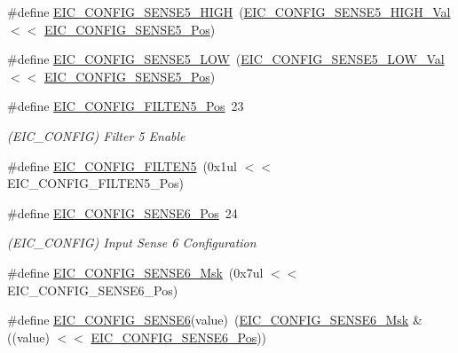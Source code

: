 \begin{DoxyCompactItemize}
\item 
\#define \mbox{\hyperlink{group___s_a_m_d21___e_i_c_ga2444c739cc4da9c4da66e9b43c8eb75d}{E\+I\+C\+\_\+\+C\+O\+N\+F\+I\+G\+\_\+\+S\+E\+N\+S\+E5\+\_\+\+H\+I\+GH}}~(\mbox{\hyperlink{group___s_a_m_d21___e_i_c_gafc521f838a152ea846c8ba29d2d7e578}{E\+I\+C\+\_\+\+C\+O\+N\+F\+I\+G\+\_\+\+S\+E\+N\+S\+E5\+\_\+\+H\+I\+G\+H\+\_\+\+Val}}    $<$$<$ \mbox{\hyperlink{group___s_a_m_d21___e_i_c_gace7caae074bf08e88805b591c626fb7f}{E\+I\+C\+\_\+\+C\+O\+N\+F\+I\+G\+\_\+\+S\+E\+N\+S\+E5\+\_\+\+Pos}})
\item 
\#define \mbox{\hyperlink{group___s_a_m_d21___e_i_c_gaf861de0eab75083882db5df50f0330c8}{E\+I\+C\+\_\+\+C\+O\+N\+F\+I\+G\+\_\+\+S\+E\+N\+S\+E5\+\_\+\+L\+OW}}~(\mbox{\hyperlink{group___s_a_m_d21___e_i_c_ga4a2958b65315240e85c9bf06c9c92305}{E\+I\+C\+\_\+\+C\+O\+N\+F\+I\+G\+\_\+\+S\+E\+N\+S\+E5\+\_\+\+L\+O\+W\+\_\+\+Val}}     $<$$<$ \mbox{\hyperlink{group___s_a_m_d21___e_i_c_gace7caae074bf08e88805b591c626fb7f}{E\+I\+C\+\_\+\+C\+O\+N\+F\+I\+G\+\_\+\+S\+E\+N\+S\+E5\+\_\+\+Pos}})
\item 
\#define \mbox{\hyperlink{group___s_a_m_d21___e_i_c_gab3c6837a90614cf79a4d0feece41fdd6}{E\+I\+C\+\_\+\+C\+O\+N\+F\+I\+G\+\_\+\+F\+I\+L\+T\+E\+N5\+\_\+\+Pos}}~23
\begin{DoxyCompactList}\small\item\em (E\+I\+C\+\_\+\+C\+O\+N\+F\+IG) Filter 5 Enable \end{DoxyCompactList}\item 
\#define \mbox{\hyperlink{group___s_a_m_d21___e_i_c_ga01928d66cdcdba5ec3176653d2b3ea2a}{E\+I\+C\+\_\+\+C\+O\+N\+F\+I\+G\+\_\+\+F\+I\+L\+T\+E\+N5}}~(0x1ul $<$$<$ E\+I\+C\+\_\+\+C\+O\+N\+F\+I\+G\+\_\+\+F\+I\+L\+T\+E\+N5\+\_\+\+Pos)
\item 
\#define \mbox{\hyperlink{group___s_a_m_d21___e_i_c_ga17d194da98be0777ff750650293d386d}{E\+I\+C\+\_\+\+C\+O\+N\+F\+I\+G\+\_\+\+S\+E\+N\+S\+E6\+\_\+\+Pos}}~24
\begin{DoxyCompactList}\small\item\em (E\+I\+C\+\_\+\+C\+O\+N\+F\+IG) Input Sense 6 Configuration \end{DoxyCompactList}\item 
\#define \mbox{\hyperlink{group___s_a_m_d21___e_i_c_gac684b5c6844dd155ee1507dbb1e83d87}{E\+I\+C\+\_\+\+C\+O\+N\+F\+I\+G\+\_\+\+S\+E\+N\+S\+E6\+\_\+\+Msk}}~(0x7ul $<$$<$ E\+I\+C\+\_\+\+C\+O\+N\+F\+I\+G\+\_\+\+S\+E\+N\+S\+E6\+\_\+\+Pos)
\item 
\#define \mbox{\hyperlink{group___s_a_m_d21___e_i_c_ga8cd719665a49e3077bf14150693a94d7}{E\+I\+C\+\_\+\+C\+O\+N\+F\+I\+G\+\_\+\+S\+E\+N\+S\+E6}}(value)~(\mbox{\hyperlink{group___s_a_m_d21___e_i_c_gac684b5c6844dd155ee1507dbb1e83d87}{E\+I\+C\+\_\+\+C\+O\+N\+F\+I\+G\+\_\+\+S\+E\+N\+S\+E6\+\_\+\+Msk}} \& ((value) $<$$<$ \mbox{\hyperlink{group___s_a_m_d21___e_i_c_ga17d194da98be0777ff750650293d386d}{E\+I\+C\+\_\+\+C\+O\+N\+F\+I\+G\+\_\+\+S\+E\+N\+S\+E6\+\_\+\+Pos}}))
$$
\end{DoxyCompactItemize}

